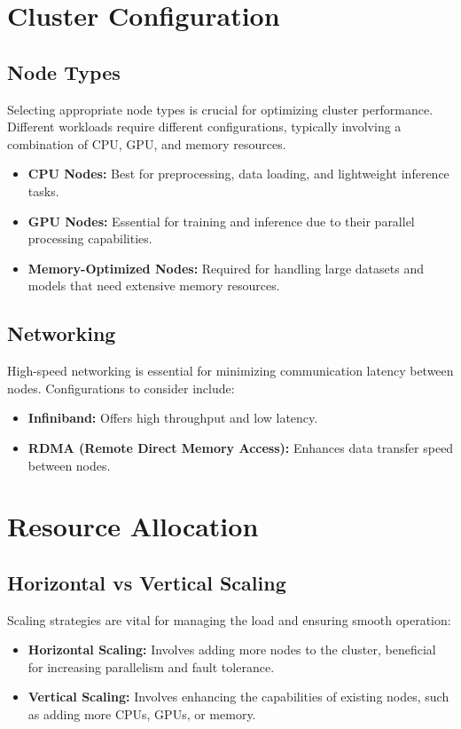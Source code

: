 \section{Cluster Configuration}

\subsection{Node Types}
Selecting appropriate node types is crucial for optimizing cluster performance. Different workloads require different configurations, typically involving a combination of CPU, GPU, and memory resources.

\begin{itemize}
    \item \textbf{CPU Nodes:} Best for preprocessing, data loading, and lightweight inference tasks.
    \item \textbf{GPU Nodes:} Essential for training and inference due to their parallel processing capabilities.
    \item \textbf{Memory-Optimized Nodes:} Required for handling large datasets and models that need extensive memory resources.
\end{itemize}

\subsection{Networking}
High-speed networking is essential for minimizing communication latency between nodes. Configurations to consider include:
\begin{itemize}
    \item \textbf{Infiniband:} Offers high throughput and low latency.
    \item \textbf{RDMA (Remote Direct Memory Access):} Enhances data transfer speed between nodes.
\end{itemize}

\section{Resource Allocation}

\subsection{Horizontal vs Vertical Scaling}
Scaling strategies are vital for managing the load and ensuring smooth operation:
\begin{itemize}
    \item \textbf{Horizontal Scaling:} Involves adding more nodes to the cluster, beneficial for increasing parallelism and fault tolerance.
    \item \textbf{Vertical Scaling:} Involves enhancing the capabilities of existing nodes, such as adding more CPUs, GPUs, or memory.
\end{itemize}

